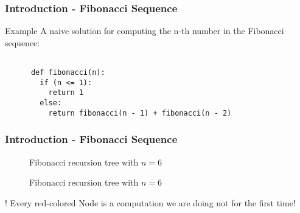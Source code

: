 \begin{frame}[fragile]
  \frametitle{Introduction - Fibonacci Sequence}
  \begin{block}{Example}
    A naive solution for computing the n-th number in the 
    Fibonacci sequence:
  \end{block}
  \begin{lstlisting}

      def fibonacci(n):
        if (n <= 1):
          return 1
        else:
          return fibonacci(n - 1) + fibonacci(n - 2)

    \end{lstlisting}
\end{frame}


\begin{frame}
\frametitle{Introduction - Fibonacci Sequence}
\begin{figure}[ht]
  \centering
  \caption{Fibonacci recursion tree with $n = 6$}
\end{figure}
\end{frame}

\begin{frame}
\begin{figure}[ht]
  \centering
  \caption{Fibonacci recursion tree with $n = 6$}
\end{figure}
\begin{alertblock}{!}
  Every red-colored Node is a computation we are doing not for the
  first time!
\end{alertblock}
\end{frame}



